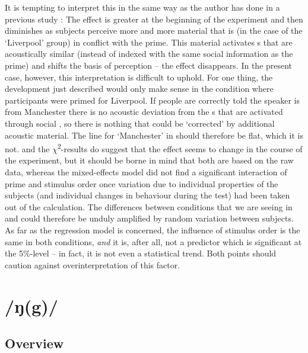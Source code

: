 It is tempting to interpret this in the same way as the author has done in a previous study \parencite[cf.][]{juskanma}: The  effect is greater at the beginning of the experiment and then diminishes as subjects perceive more and more material that is (in the case of the `Liverpool' group) in conflict with the prime.
This material activates s that are acoustically similar (instead of indexed with the same social information as the prime) and shifts the basis of perception -- the  effect disappears.
In the present case, however, this interpretation is difficult to uphold.
For one thing, the development just described would only make sense in the condition where participants were primed for Liverpool.
If people are correctly told the speaker is from Manchester there is no acoustic deviation from the s that are activated through social , so there is nothing that could be `corrected' by additional acoustic material.
The line for `Manchester' in  should therefore be flat, which it is not.
 and the \(\chi\)\textsuperscript{2}-results do suggest that the  effect seems to change in the course of the experiment, but it should be borne in mind that both are based on the raw data, whereas the mixed-effects model did not find a significant interaction of prime and stimulus order once variation due to individual properties of the subjects (and individual changes in behaviour during the test) had been taken out of the calculation.
The differences between conditions that we are seeing in  and  could therefore be unduly amplified by random variation between subjects.
As far as the regression model is concerned, the influence of stimulus order is the same in both conditions, \emph{and} it is, after all, not a predictor which is significant at the 5\%-level -- in fact, it is not even a statistical trend.
Both points should caution against overinterpretation of this factor.


\section{/ŋ(g)/}
\label{sec.perc_res.ng}
	\subsection{Overview}
	\label{sec.perc_res.ng.overview}

